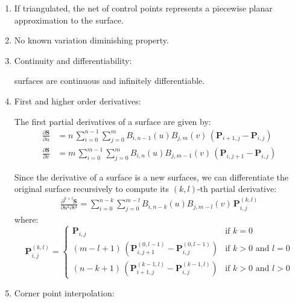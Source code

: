 \begin{enumerate}
    \item If triangulated, the net of control points represents a piecewise planar approximation to the \Bezier surface.

    \item No known variation diminishing property.
    
    \item Continuity and differentiability:

    \Bezier surfaces are continuous and infinitely differentiable.
    
    \item First and higher order derivatives:
    
    The first partial derivatives of a \Bezier surface are given by:
        \begin{align*}
            \frac{\partial\mathbf{S}}{\partial u} &= n \, \sum_{i=0}^{n-1} \sum_{j=0}^{m} B_{i,n-1}(u) B_{j,m}(v)\, \left( \mathbf{P}_{i+1,j} - \mathbf{P}_{i,j} \right) \\
            \frac{\partial\mathbf{S}}{\partial v} &= m \, \sum_{i=0}^{m-1} \sum_{j=0}^{m} B_{i,n}(u) B_{j,m-1}(v)\, \left( \mathbf{P}_{i,j+1} - \mathbf{P}_{i,j} \right)
        \end{align*}
    
    Since the derivative of a \Bezier surface is a new \Bezier surfaces, we can differentiate the original surface recursively to compute its $(k,l)$-th partial derivative:
    \begin{align*}
        \frac{\partial^{k+l}\mathbf{S}}{\partial u^{k} \partial v^{l}} = \sum_{i=0}^{n-k}\sum_{j=0}^{m-l} B_{i,n-k}(u)B_{j,m-l}(v) \, \mathbf{P}_{i,j}^{(k,l)}
    \end{align*}
    where:
    \begin{equation*}
        \mathbf{P}_{i,j}^{(k,l)} =  \begin{cases}
            \mathbf{P}_{i,j} & \text{if $k=0$}\\[1.0ex]
            (m-l+1) \, (\mathbf{P}_{i,j+1}^{(0,l-1)} - \mathbf{P}_{i,j}^{(0,l-1)}) &\text{if $k>0$ and $l=0$} \\[1.0ex]
            (n-k+1) \, (\mathbf{P}_{i+1,j}^{(k-1,l)} - \mathbf{P}_{i,j}^{(k-1,l)}) &\text{if $k>0$ and $l>0$}
            \end{cases}
    \end{equation*}
    
    
        
    \item Corner point interpolation:
    

\end{enumerate}
